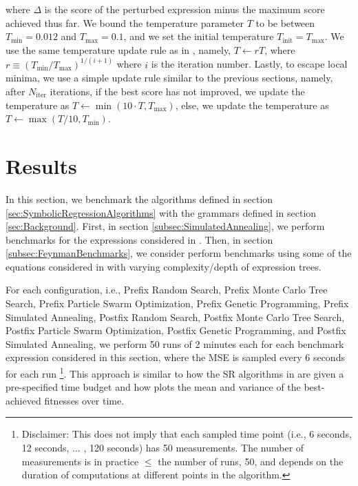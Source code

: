 \documentclass[12pt]{iopart}
\begin{document}
where $\Delta$ is the score of the perturbed expression minus the maximum score achieved thus far. We bound the temperature parameter $T$ to be between $T_{\mathrm{min}} = 0.012$ and $T_{\mathrm{max}} = 0.1$, and we set the initial temperature $T_{\mathrm{init}} = T_{\mathrm{max}}$. We use the same temperature update rule as in \cite{10.1145/3449639.3459345}, namely, $T \gets rT$, where $r \equiv \left(T_{\mathrm{min}}/T_{\mathrm{max}}\right)^{1/(i+1)}$ where $i$ is the iteration number. Lastly, to escape local minima, we use a simple update rule similar to the previous sections, namely, after $N_{\mathrm{iter}}$ iterations, if the best score has not improved, we update the temperature as $T \gets \min{\left(10\cdot T, T_{\mathrm{max}}\right)}$, else, we update the temperature as $T \gets \max{\left(T/10, T_{\mathrm{min}}\right)}$.

\section{Results}\label{sec:Results}
In this section, we benchmark the algorithms defined in section \ref{sec:SymbolicRegressionAlgorithms} with the grammars defined in section \ref{sec:Background}. First, in section \ref{subsec:SimulatedAnnealing}, we perform benchmarks for the expressions considered in \cite{hemberg2008pre}. Then, in section \ref{subsec:FeynmanBenchmarks}, we consider perform benchmarks using some of the equations considered in \cite{udrescu2020ai} with varying complexity/depth of expression trees.
\par For each configuration, i.e., Prefix Random Search, Prefix Monte Carlo Tree Search, Prefix Particle Swarm Optimization, Prefix Genetic Programming,  Prefix Simulated Annealing, Postfix Random Search, Postfix Monte Carlo Tree Search, Postfix Particle Swarm Optimization, Postfix Genetic Programming, and Postfix Simulated Annealing, we perform 50 runs of 2 minutes each for each benchmark expression considered in this section, where the MSE is sampled every 6 seconds for each run \footnote{Disclaimer: This does not imply that each sampled time point (i.e., 6 seconds, 12 seconds, $\ldots$ , 120 seconds) has 50 measurements. The number of measurements is in practice $\leq$ the number of runs, 50, and depends on the duration of computations at different points in the algorithm.}. This approach is similar to how the SR algorithms in \cite{defranca2023interpretable} are given a pre-specified time budget and how \cite{manti2023discovering} plots the mean and variance of the best-achieved fitnesses over time. 
\end{document}
